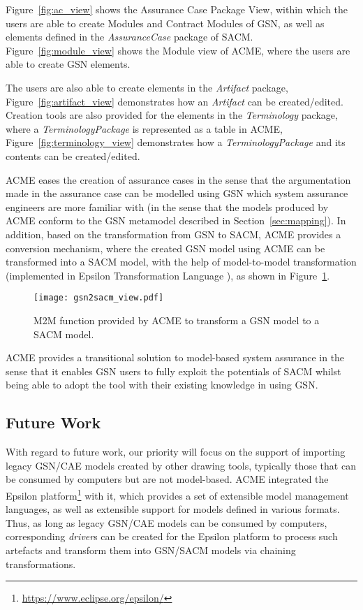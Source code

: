 Figure~\ref{fig:ac_view} shows the Assurance Case Package View, within which the users are able to create Modules and Contract Modules of GSN, as well as elements defined in the \textit{AssuranceCase} package of SACM. Figure~\ref{fig:module_view} shows the Module view of ACME, where the users are able to create GSN elements. 

The users are also able to create elements in the \textit{Artifact} package, Figure~\ref{fig:artifact_view} demonstrates how an \textit{Artifact} can be created/edited. Creation tools are also provided for the elements in the \textit{Terminology} package, where a \textit{TerminologyPackage} is represented as a table in ACME, Figure~\ref{fig:terminology_view} demonstrates how a \textit{TerminologyPackage} and its contents can be created/edited.

ACME eases the creation of assurance cases in the sense that the argumentation made in the assurance case can be modelled using GSN which system assurance engineers are more familiar with (in the sense that the models produced by ACME conform to the GSN metamodel described in Section~\ref{sec:mapping}). In addition, based on the transformation from GSN to SACM, ACME provides a conversion mechanism, where the created GSN model using ACME can be transformed into a SACM model, with the help of model-to-model transformation (implemented in Epsilon Transformation Language \cite{kolovos2008epsilon}), as shown in Figure~\ref{fig:transformation_view}.

\begin{figure}
	\centering
	\texttt{[image: gsn2sacm\_view.pdf]}
	\caption{M2M function provided by ACME to transform a GSN model to a SACM model.}
	\label{fig:transformation_view}
\end{figure}

ACME provides a transitional solution to model-based system assurance in the sense that it enables GSN users to fully exploit the potentials of SACM whilst being able to adopt the tool with their existing knowledge in using GSN. 

\subsection{Future Work}
With regard to future work, our priority will focus on the support of importing legacy GSN/CAE models created by other drawing tools, typically those that can be consumed by computers but are not model-based. ACME integrated the Epsilon platform\footnote{\url{https://www.eclipse.org/epsilon/}} with it, which provides a set of extensible model management languages, as well as extensible support for models defined in various formats. Thus, as long as legacy GSN/CAE models can be consumed by computers, corresponding \textit{driver}s can be created for the Epsilon platform to process such artefacts and transform them into GSN/SACM models via chaining transformations.

